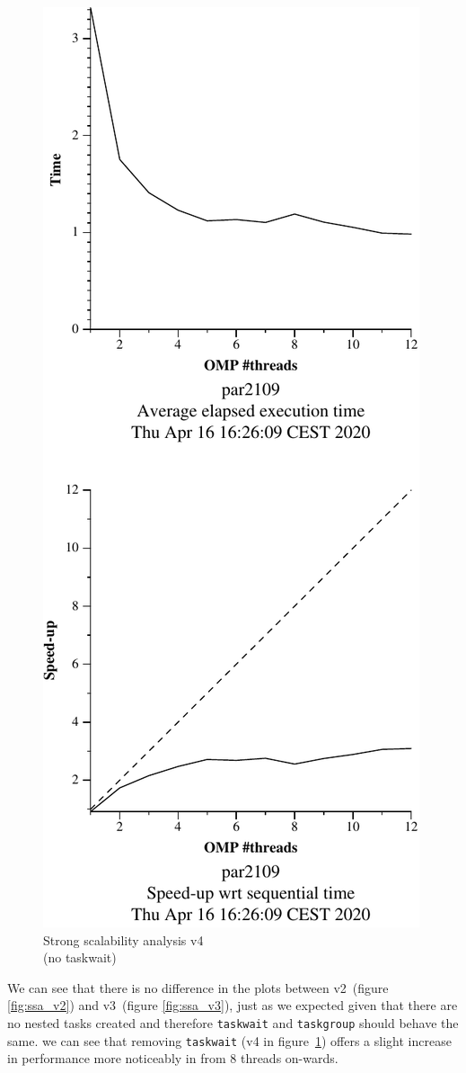 \begin{figure}[H]
\begin{minipage}{0.5\textwidth}
        \includegraphics[width=0.7\linewidth]{plots/v4-crop.pdf}
        \caption{Strong scalability analysis v4 \\ (no taskwait)}
        \label{fig:ssa_v4} 
    \end{minipage}
\end{figure}

We can see that there is no difference in the plots between v2~(figure \ref{fig:ssa_v2}) and v3~(figure \ref{fig:ssa_v3}), just as we
expected given that there are no nested tasks created and therefore \texttt{taskwait} and \texttt{taskgroup} should
behave the same. we can see that removing \texttt{taskwait} (v4 in figure~\ref{fig:ssa_v4}) offers a slight increase in performance more noticeably in from 8 threads on-wards.

